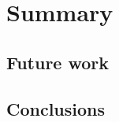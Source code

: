 \documentclass[thesis]{subfiles}
\begin{document}





\chapter{Summary}

%
%
%
%

\section{Future work}
\label{sec:future_work}


\section{Conclusions}
\end{document}
